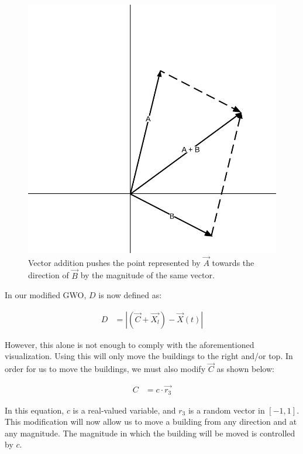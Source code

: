 \begin{figure}[h!]
	\centering
	\includegraphics[scale=0.45]{./images/chap05-methodology/vector-addition-visualization.png}
	\caption{Vector addition pushes the point represented by $\vec{A}$ towards the direction of $\vec{B}$ by the magnitude of the same vector.}
	\label{vector-addition-visualization}
\end{figure}

In our modified GWO, $D$ is now defined as:

\begin{align}
	D &= \left | (\vec{C} + \vec{X_{l}}) - \vec{X}(t) \right | \label{modified-gwo-d}
\end{align}

However, this alone is not enough to comply with the aforementioned visualization. Using this will only move the buildings to the right and/or top. In order for us to move the buildings, we must also modify $\vec{C}$ as shown below:

\begin{align}
	C &= c \cdot \vec{r_{3}} \label{modified-gwo-c}
\end{align}

In this equation, $c$ is a real-valued variable, and $r_{3}$ is a random vector in $[-1, 1]$. This modification will now allow us to move a building from any direction and at any magnitude. The magnitude in which the building will be moved is controlled by $c$.

